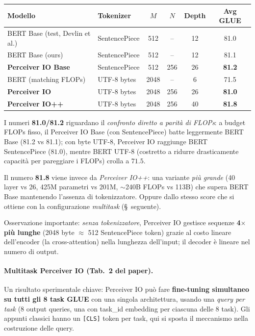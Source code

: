\documentclass[
  11pt,
]{article}
\begin{document}
{\small
\begin{longtable}{@{}p{4.5cm} p{2.5cm} c c c c@{}}
\toprule
\textbf{Modello} & \textbf{Tokenizer} & \textbf{$M$} & \textbf{$N$} & \textbf{Depth} & \textbf{Avg GLUE} \\
\midrule
\endhead
BERT Base (test, Devlin et al.) & SentencePiece & 512 & -- & 12 & 81.0 \\[2pt]
BERT Base (ours) & SentencePiece & 512 & -- & 12 & 81.1 \\[2pt]
\textbf{Perceiver IO Base} & SentencePiece & 512 & 256 & 26 & \textbf{81.2} \\[2pt]
\midrule
BERT (matching FLOPs) & UTF-8 bytes & 2048 & -- & 6 & 71.5 \\[2pt]
\textbf{Perceiver IO} & UTF-8 bytes & 2048 & 256 & 26 & \textbf{81.0} \\[2pt]
\textbf{Perceiver IO++} & UTF-8 bytes & 2048 & 256 & 40 & \textbf{81.8} \\
\bottomrule
\end{longtable}
}

\begin{notabox}[title={\textbf{Perceiver IO su GLUE: due risultati, uno spesso confuso}}]
I numeri \textbf{81.0/81.2} riguardano il \emph{confronto diretto a parità di FLOPs}: a budget FLOPs fisso, il Perceiver IO Base (con SentencePiece) batte leggermente BERT Base (81.2 vs 81.1); con byte UTF-8, Perceiver IO raggiunge BERT SentencePiece ($81.0$), mentre BERT UTF-8 (costretto a ridurre drasticamente capacità per pareggiare i FLOPs) crolla a $71.5$.

Il numero \textbf{81.8} viene invece da \emph{Perceiver IO++}: una variante \emph{più grande} (40 layer vs 26, 425M parametri vs 201M, $\sim$240B FLOPs vs 113B) che supera BERT Base mantenendo l'assenza di tokenizzatore. Oppure dallo stesso score che si ottiene con la configurazione \emph{multitask} (\S~seguente).

Osservazione importante: \emph{senza tokenizzatore}, Perceiver IO gestisce sequenze \textbf{4$\times$ più lunghe} (2048 byte $\approx$ 512 SentencePiece token) grazie al costo lineare dell'encoder (la cross-attention) nella lunghezza dell'input; il decoder è lineare nel numero di output.
\end{notabox}

\paragraph{Multitask Perceiver IO (Tab.\ 2 del paper).} Un risultato sperimentale chiave: Perceiver IO può fare \textbf{fine-tuning simultaneo su tutti gli 8 task GLUE} con una singola architettura, usando una \emph{query per task} (8 output queries, una con task\_id embedding per ciascuna delle 8 task). Gli appunti classici hanno un \texttt{[CLS]} token per task, qui si sposta il meccanismo nella costruzione delle query.
\end{document}
